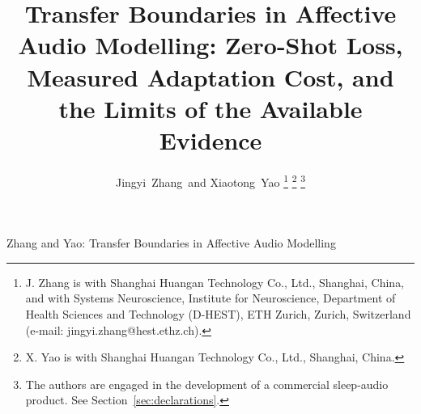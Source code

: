 %
%
%




\title{Transfer Boundaries in Affective Audio Modelling:
Zero-Shot Loss, Measured Adaptation Cost, and the Limits of the
Available Evidence}

\author{Jingyi~Zhang\, and Xiaotong~Yao%
\thanks{J. Zhang is with Shanghai Huangan Technology Co., Ltd., Shanghai,
China, and with Systems Neuroscience, Institute for Neuroscience, Department
of Health Sciences and Technology (D-HEST), ETH Zurich, Zurich, Switzerland
(e-mail: jingyi.zhang@hest.ethz.ch).}%
\thanks{X. Yao is with Shanghai Huangan Technology Co., Ltd., Shanghai,
China.}%
\thanks{The authors are engaged in the development of a commercial
sleep-audio product. See Section~\ref{sec:declarations}.}}

%
{Zhang and Yao: Transfer Boundaries in Affective Audio Modelling}

